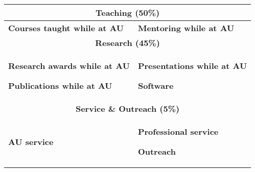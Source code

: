 {\small\sffamily
\begin{tabular}{ @{} p{3.2in} p{3.2in} @{} }
    \hline
    \multicolumn{2}{c}{\textbf{Teaching (50\%)}} \\
    \hline
    \textbf{Courses taught while at AU}
    
    &
    \textbf{Mentoring while at AU}
    
    \\
    \hline
    \multicolumn{2}{c}{\textbf{Research (45\%)}} \\
    \hline
    \textbf{Research awards while at AU}
    
    \textbf{Publications while at AU}
    
    &
    \textbf{Presentations while at AU}
    
    \textbf{Software}
    
    \\
    \hline
    \multicolumn{2}{c}{\textbf{Service \& Outreach (5\%)}} \\
    \hline
    \textbf{AU service}
    
    &
    \textbf{Professional service}
    
    \textbf{Outreach}
    
    \\
    \hline
\end{tabular}
}
